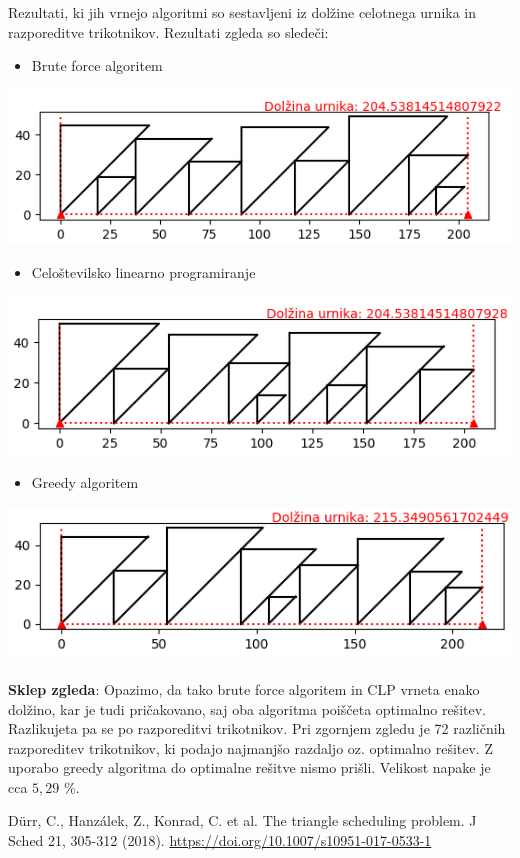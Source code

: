 \documentclass[a4paper,12pt]{article}
\theoremstyle{definition}
\theoremstyle{plain}
\begin{document}
Rezultati, ki jih vrnejo algoritmi so sestavljeni iz dolžine celotnega urnika in razporeditve trikotnikov. Rezultati
zgleda so sledeči:
\begin{itemize}
    \item Brute force algoritem
\end{itemize}    
    \includegraphics[]{sim_brut.png}
    \newpage
    \begin{itemize}
    \item Celoštevilsko linearno programiranje
\end{itemize}    
    \includegraphics[]{sim_clp.png}
    \begin{itemize}
    \item Greedy algoritem
\end{itemize}    
    \includegraphics[]{sim_greedy.png}
\\ \\
\textbf{Sklep zgleda}: Opazimo, da tako brute force algoritem in CLP vrneta enako dolžino,
kar je tudi pričakovano, saj oba algoritma poiščeta optimalno rešitev. Razlikujeta pa se po
razporeditvi trikotnikov. Pri zgornjem zgledu je 72 različnih razporeditev trikotnikov, ki podajo najmanjšo
razdaljo oz. optimalno rešitev. Z uporabo greedy algoritma do optimalne rešitve nismo
prišli. Velikost napake je cca $5,29$ \%.

\newpage
\begin{thebibliography}{9}
          Dürr, C., Hanzálek, Z., Konrad, C. et al. The triangle scheduling problem. J Sched 21, 305-312 (2018). \href{https://doi.org/10.1007/s10951-017-0533-1}{https://doi.org/10.1007/s10951-017-0533-1 }
\end{thebibliography}
\end{document}
